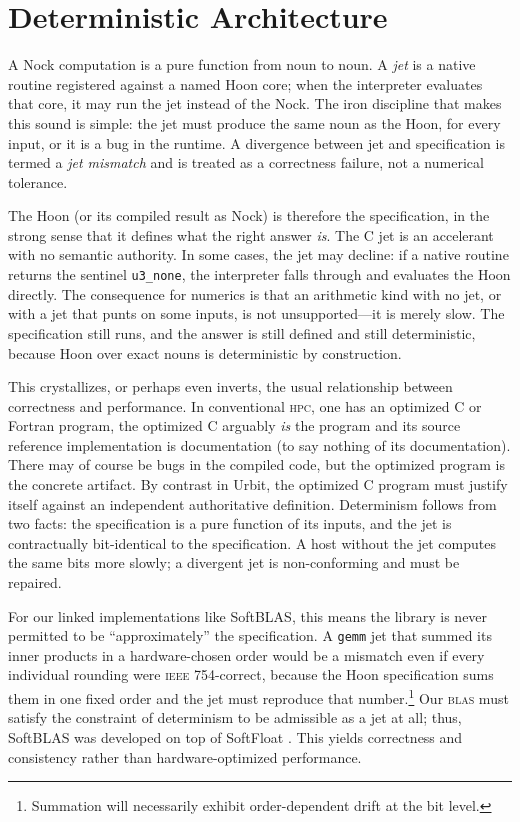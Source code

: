 \documentclass[twoside]{article}
\begin{document}
\section{Deterministic Architecture}

A Nock computation is a pure function from noun to noun.  A \emph{jet} is a native routine registered against a named Hoon core; when the interpreter evaluates that core, it may run the jet instead of the Nock.  The iron discipline that makes this sound is simple:  the jet must produce the same noun as the Hoon, for every input, or it is a bug in the runtime.  A divergence between jet and specification is termed a \emph{jet mismatch} and is treated as a correctness failure, not a numerical tolerance.

The Hoon (or its compiled result as Nock) is therefore the specification, in the strong sense that it defines what the right answer \emph{is}.  The C jet is an accelerant with no semantic authority.  In some cases, the jet may decline:  if a native routine returns the sentinel \texttt{u3\_none}, the interpreter falls through and evaluates the Hoon directly.  The consequence for numerics is that an arithmetic kind with no jet, or with a jet that punts on some inputs, is not unsupported---it is merely slow.  The specification still runs, and the answer is still defined and still deterministic, because Hoon over exact nouns is deterministic by construction.

This crystallizes, or perhaps even inverts, the usual relationship between correctness and performance.  In conventional \textsc{hpc}, one has an optimized C or Fortran program, the optimized C arguably \emph{is} the program and its source reference implementation is documentation (to say nothing of its documentation).  There may of course be bugs in the compiled code, but the optimized program is the concrete artifact.  By contrast in Urbit, the optimized C program must justify itself against an independent authoritative definition.  Determinism follows from two facts:  the specification is a pure function of its inputs, and the jet is contractually bit-identical to the specification.  A host without the jet computes the same bits more
slowly; a divergent jet is non-conforming and must be repaired.

For our linked implementations like SoftBLAS, this means the library is never permitted to be ``approximately'' the specification. A \texttt{gemm} jet that summed its inner products in a hardware-chosen order would be a mismatch even if every individual rounding were \textsc{ieee} 754-correct, because the Hoon specification sums them in
one fixed order and the jet must reproduce that number.\footnote{Summation will necessarily exhibit order-dependent drift at the bit level.}  Our \textsc{blas} must satisfy the constraint of determinism to be admissible as a jet at all; thus, SoftBLAS was developed on top of SoftFloat \citep{hauser_softfloat}.  This yields correctness and consistency rather than hardware-optimized performance.
\end{document}
